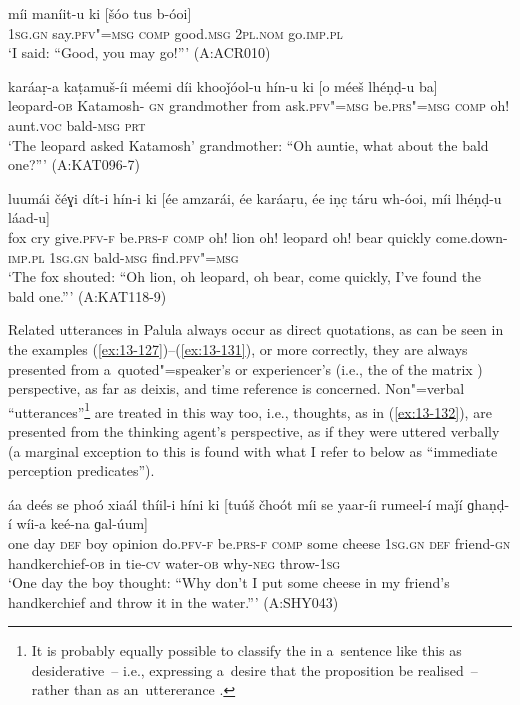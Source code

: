 \begin{exe}
\ex
\label{ex:13-129}
\gll míi maníit-u ki [šóo tus b-óoi]  \\
\textsc{1sg.gn} say.\textsc{pfv"=msg} \textsc{comp} good.\textsc{msg} \textsc{2pl.nom} go.\textsc{imp.pl} \\
\glt `I said: ``Good, you may go!''' (A:ACR010)

\ex
\label{ex:13-130}
\gll karáaṛ-a kaṭamuš-íi méemi díi  khooǰóol-u hín-u ki [o méeš  lhéṇḍ-u ba] \\
leopard-\textsc{ob} Katamosh-\textsc{ gn} grandmother from  ask.\textsc{pfv"=msg} be.\textsc{prs"=msg} \textsc{comp} oh! aunt.\textsc{voc}  bald-\textsc{msg} \textsc{prt } \\
\glt `The leopard asked Katamosh' grandmother: ``Oh auntie, what about the bald one?''' (A:KAT096-7)

\ex
\label{ex:13-131}
\gll luumái čéɣi dít-i hín-i ki [ée amzarái,  ée karáaṛu,
  ée iṇc̣ táru wh-óoi, míi  lhéṇḍ-u láad-u] \\
fox cry give.\textsc{pfv-f} be.\textsc{prs-f} \textsc{comp} oh! lion  oh! leopard oh! bear quickly come.down-\textsc{imp.pl} \textsc{1sg.gn} bald-\textsc{msg} find.\textsc{pfv"=msg}  \\
\glt `The fox shouted: ``Oh lion, oh leopard, oh bear, come quickly, I've found the bald one.''' (A:KAT118-9) 
\end{exe}

Related utterances in Palula always occur as direct quotations, as can be seen in the examples (\ref{ex:13-127})--(\ref{ex:13-131}), or more correctly, they are always presented from a~quoted"=speaker's or experiencer's (i.e., the  of the matrix ) perspective, as far as deixis,  and time reference is concerned. Non"=verbal ``utterances''\footnote{It is probably equally possible to classify the  in a~sentence like this as desiderative~-- i.e., expressing a~desire that the proposition be realised~-- rather than as an~uttererance .} are treated in this way too, i.e., thoughts, as in (\ref{ex:13-132}), are presented from the thinking agent's perspective, as if they were uttered verbally (a marginal exception to this is found with what I refer to below as ``immediate perception predicates''). 

\begin{exe}
\ex
\label{ex:13-132}
\gll áa deés se phoó xiaál thíil-i híni ki  [tuúš čhoót míi
  se yaar-íi rumeel-í  maǰí ɡhaṇḍ-í wíi-a keé-na ɡal-úum] \\
one day \textsc{def} boy opinion do.\textsc{pfv-f} be.\textsc{prs-f} \textsc{comp}   some cheese \textsc{1sg.gn} \textsc{def} friend-\textsc{gn} handkerchief-\textsc{ob}  in tie-\textsc{cv} water-\textsc{ob} why-\textsc{neg} throw-\textsc{1sg} \\
\glt `One day the boy thought: ``Why don't I put some cheese in my friend's handkerchief and throw it in the water.''' (A:SHY043)
\end{exe}

